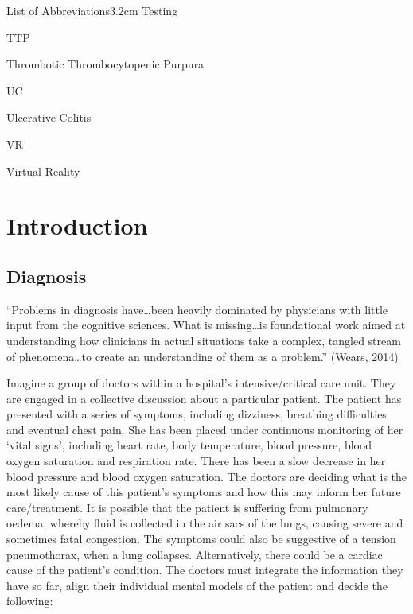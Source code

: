 \documentclass[a4paper, nobind]{templates/ociamthesis}
\begin{document}
\begin{romanpages}
\begin{mclistof}{List of Abbreviations}{3.2cm}
Testing

\item[TTP]

Thrombotic Thrombocytopenic Purpura

\item[UC]

Ulcerative Colitis

\item[VR]

Virtual Reality

\end{mclistof} 


\end{romanpages}

\flushbottom

\hypertarget{introduction}{%
\chapter*{Introduction}\label{introduction}}

\adjustmtc
{}

\hypertarget{diagnosis}{%
\section*{Diagnosis}\label{diagnosis}}

``Problems in diagnosis have\ldots been heavily dominated by physicians with little input from the cognitive sciences. What is missing\ldots is foundational work aimed at understanding how clinicians in actual situations take a complex, tangled stream of phenomena\ldots to create an understanding of them as a problem.'' (Wears, 2014)

Imagine a group of doctors within a hospital's intensive/critical care unit. They are engaged in a collective discussion about a particular patient. The patient has presented with a series of symptoms, including dizziness, breathing difficulties and eventual chest pain. She has been placed under continuous monitoring of her `vital signs', including heart rate, body temperature, blood pressure, blood oxygen saturation and respiration rate. There has been a slow decrease in her blood pressure and blood oxygen saturation. The doctors are deciding what is the most likely cause of this patient's symptoms and how this may inform her future care/treatment. It is possible that the patient is suffering from pulmonary oedema, whereby fluid is collected in the air sacs of the lungs, causing severe and sometimes fatal congestion. The symptoms could also be suggestive of a tension pneumothorax, when a lung collapses. Alternatively, there could be a cardiac cause of the patient's condition. The doctors must integrate the information they have so far, align their individual mental models of the patient and decide the following:
\end{document}

